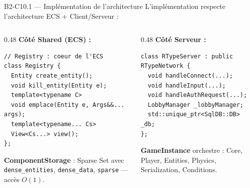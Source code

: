 \documentclass[aspectratio=169,10pt]{beamer}
\begin{document}
\begin{frame}[fragile]{B2-C10.1 — Implémentation de l'architecture}
\footnotesize
L'implémentation respecte l'architecture ECS + Client/Serveur :

\begin{columns}[T]
\begin{column}{0.48\textwidth}
\textbf{Côté Shared (ECS) :}
\begin{lstlisting}
// Registry : coeur de l'ECS
class Registry {
  Entity create_entity();
  void kill_entity(Entity e);
  template<typename C>
  void emplace(Entity e, Args&&... args);
  template<typename... Cs>
  View<Cs...> view();
};
\end{lstlisting}

\textbf{ComponentStorage} : Sparse Set avec \texttt{dense\_entities}, \texttt{dense\_data}, \texttt{sparse} — accès $O(1)$.
\end{column}

\begin{column}{0.48\textwidth}
\textbf{Côté Serveur :}
\begin{lstlisting}
class RTypeServer : public RTypeNetwork {
  void handleConnect(...);
  void handleInput(...);
  void handleAuthRequest(...);
  LobbyManager _lobbyManager;
  std::unique_ptr<SqlDB::DB> _db;
};
\end{lstlisting}

\textbf{GameInstance} orchestre : Core, Player, Entities, Physics, Serialization, Conditions.
\end{column}
\end{columns}
\end{frame}
\end{document}
